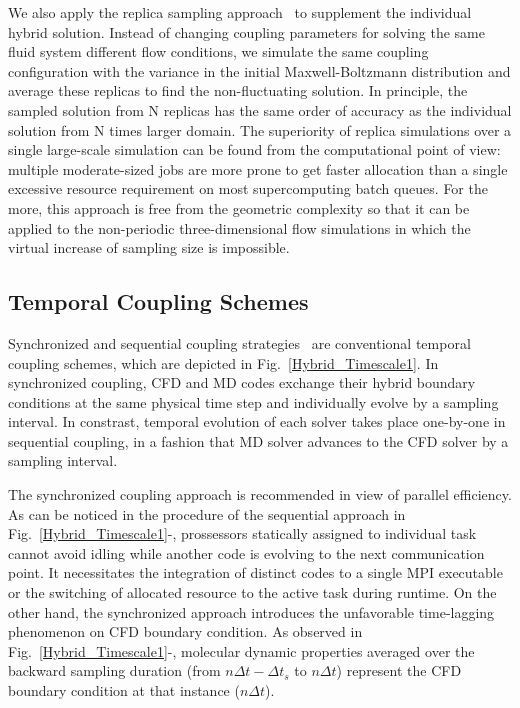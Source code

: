 \documentclass[preprint,12pt]{elsarticle}
\begin{document}
We also apply the replica sampling approach~\cite{REMD} to supplement the individual hybrid solution. Instead of changing coupling parameters for solving the same fluid system different flow conditions, we simulate the same coupling configuration with the variance in the initial Maxwell-Boltzmann distribution and average these replicas to find the non-fluctuating solution. In principle, the sampled solution from N replicas has the same order of accuracy as the individual solution from N times larger domain. The superiority of replica simulations over a single large-scale simulation can be found from the computational point of view: multiple moderate-sized jobs are more prone to get faster allocation than a single excessive resource requirement on most supercomputing batch queues. For the more, this approach is free from the geometric complexity so that it can be applied to the non-periodic three-dimensional flow simulations in which the virtual increase of sampling size is impossible.



\subsection{Temporal Coupling Schemes}
\label{sec:numerical_temporal}

Synchronized and sequential coupling strategies~\cite{Time_Mechanism} are
conventional temporal coupling schemes, which are depicted in
Fig.~\ref{Hybrid_Timescale1}. In synchronized coupling, CFD and MD codes
exchange their hybrid boundary conditions at the same physical time step
and individually evolve by a sampling interval. In constrast, temporal
evolution of each solver takes place one-by-one in sequential coupling,
in a fashion that MD solver advances to the CFD solver by a sampling interval.

The synchronized coupling approach is recommended in view of parallel efficiency.
As can be noticed in the procedure of the sequential approach in
Fig.~\ref{Hybrid_Timescale1}-,
prossessors statically assigned to individual task cannot avoid idling
while another code is evolving to the next communication point.
It necessitates the integration of distinct codes to a single MPI executable
or the switching of allocated resource to the active task during runtime.
On the other hand, the synchronized approach introduces the unfavorable
time-lagging phenomenon on CFD boundary condition. As observed in
Fig.~\ref{Hybrid_Timescale1}-, molecular dynamic
properties averaged over the backward sampling duration
(from $n{\Delta}t-{\Delta}t_{s}$ to $n{\Delta}t$) represent the CFD
boundary condition at that instance ($n{\Delta}t$).
\end{document}
